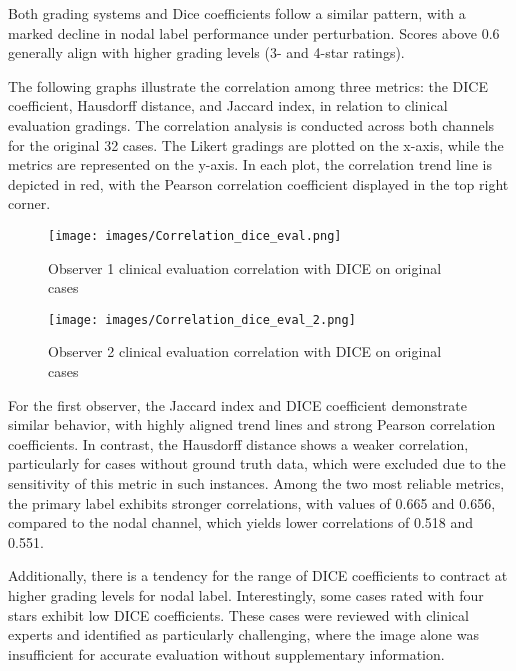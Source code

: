 Both grading systems and Dice coefficients follow a similar pattern, with a marked decline in nodal label performance under perturbation. Scores above 0.6 generally align with higher grading levels (3- and 4-star ratings).

\newpage
The following graphs illustrate the correlation among three metrics: the DICE coefficient, Hausdorff distance, and Jaccard index, 
in relation to clinical evaluation gradings. The correlation analysis is conducted across both channels for the original 32 cases. 
The Likert gradings are plotted on the x-axis, while the metrics are represented on the y-axis. In each plot, the correlation trend 
line is depicted in red, with the Pearson correlation coefficient displayed in the top right corner.

\begin{figure}[ht]
    \centering
    \texttt{[image: images/Correlation\_dice\_eval.png]}
    \caption{Observer 1 clinical evaluation correlation with DICE on original cases}
    \label{fig:three_subfigures}
\end{figure}

\begin{figure}[ht]
    \centering
    \texttt{[image: images/Correlation\_dice\_eval\_2.png]}
    \caption{Observer 2 clinical evaluation correlation with DICE on original cases}
    \label{fig:three_subfigures}
\end{figure}
\newpage
For the first observer, the Jaccard index and DICE coefficient demonstrate similar behavior, with highly aligned trend lines and strong Pearson correlation coefficients. In contrast, the Hausdorff distance shows a weaker correlation, particularly for cases without ground truth data, which were excluded due to the sensitivity of this metric in such instances. Among the two most reliable metrics, the primary label exhibits stronger correlations, with values of 0.665 and 0.656, compared to the nodal channel, which yields lower correlations of 0.518 and 0.551.

Additionally, there is a tendency for the range of DICE coefficients to contract at higher grading levels for nodal label. Interestingly, some cases rated with four stars exhibit low DICE coefficients. These cases were reviewed with clinical experts and identified as particularly challenging, where the image alone was insufficient for accurate evaluation without supplementary information.


